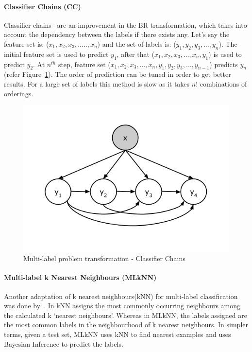 \paragraph{Classifier Chains (CC)}
Classifier chains~\cite{dembczynski2010bayes, read2011classifier} are an improvement in the BR transformation, which takes into account the dependency between the labels if there exists any. Let's say the feature set is: ($x_1, x_2, x_3,....., x_n$) and the set of labels is: ($y_1, y_2, y_3,\ldots, y_n$). The initial feature set is used to predict $y_1$, after that ($x_1, x_2, x_3,\ldots, x_n, y_1$) is used to predict $y_2$. At $n^{th}$ step, feature set ($x_1, x_2, x_3,\ldots, x_n, y_1, y_2, y_3,\ldots, y_{n-1} $) predicts $y_n$ (refer Figure~\ref{fig:CC}). The order of prediction can be tuned in order to get better results. For a large set of labels this method is slow as it takes $n!$ combinations of orderings. 
\begin{figure}[!htb]
    \centering
    \includegraphics[scale=0.5]{Figures/ClassifierChains.png}
    \caption{Multi-label problem transformation - Classifier Chains}
    \label{fig:CC}
\end{figure}


\paragraph{Multi-label k Nearest Neighbours (MLkNN)} 
Another adaptation of k nearest neighbours(kNN) for multi-label classification was done by~\cite{zhang2007ml}. In kNN assigns the most commonly occurring neighbours among the calculated k `nearest neighbours'. Whereas in MLkNN, the labels assigned are the most common labels in the neighbourhood of k nearest neighbours. In simpler terms, given a test set, MLkNN uses kNN to find nearest examples and uses Bayesian Inference to predict the labels. 

